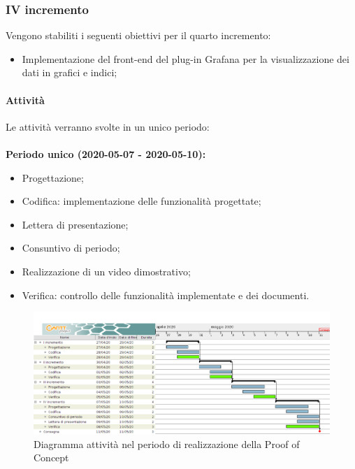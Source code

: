 \documentclass[../piano-di-progetto.tex]{subfiles}
\begin{document}
\subsubsection{IV incremento}

 Vengono stabiliti i seguenti obiettivi per il quarto incremento:
 \begin{itemize}
     \item Implementazione del front-end del plug-in Grafana per la visualizzazione dei dati in grafici e indici;
 \end{itemize}
\paragraph{Attività}
Le attività verranno svolte in un unico periodo:
\\
\\
\textbf{Periodo unico (2020-05-07 - 2020-05-10):}
\begin{itemize}
    \item Progettazione;
    \item Codifica: implementazione delle funzionalità progettate;
    \item Lettera di presentazione;
    \item Consuntivo di periodo;
    \item Realizzazione di un video dimostrativo;
    \item Verifica: controllo delle funzionalità implementate e dei documenti.
\end{itemize}



\newpage
\begin{landscape}
    \begin{figure}[H]
        \centering
        \includegraphics[width=24cm]{img/poc.png}
        \caption{Diagramma attività nel periodo di realizzazione della Proof of Concept}
      \end{figure}
\end{landscape}
\end{document}

